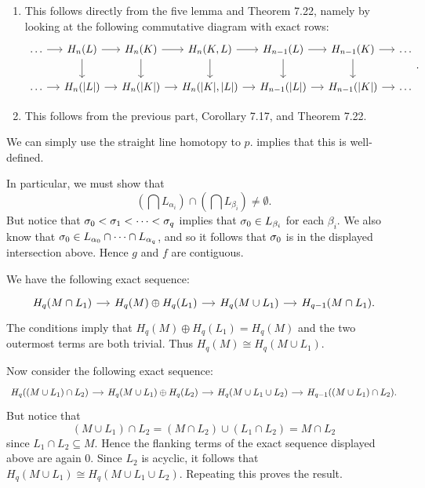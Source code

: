 \documentclass[../../solutions.tex]{subfiles}
\begin{document}
\begin{exercise} \leavevmode
\begin{enumerate}
\item
This follows directly from the five lemma and Theorem 7.22, namely by looking at the following commutative diagram with exact rows:
\[
\begin{tikzcd}[column sep=small]
\dots\ar[r] & H_n(L)\ar[d]\ar[r] & H_n(K)\ar[d]\ar[r] & H_n(K,L)\ar[d]\ar[r] & H_{n-1}(L)\ar[d]\ar[r] & H_{n-1}(K)\ar[d]\ar[r] & \dots\\
\dots\ar[r] & H_n(|L|)\ar[r] & H_n(|K|)\ar[r] & H_n(|K|,|L|)\ar[r] & H_{n-1}(|L|)\ar[r] & H_{n-1}(|K|)\ar[r] & \dots
\end{tikzcd}.
\]

\item
This follows from the previous part, Corollary 7.17, and Theorem 7.22.
\end{enumerate}
\end{exercise}

\begin{exercise} \leavevmode
We can simply use the straight line homotopy to $p$.
 implies that this is well-defined.
\end{exercise}

\begin{exercise} \leavevmode
In particular, we must show that
\[\left(\bigcap L_{\alpha_i}\right)\cap\left(\bigcap L_{\beta_i}\right)\ne\emptyset.\]
But notice that $\sigma_0<\sigma_1<\dots<\sigma_q$ implies that $\sigma_0\in L_{\beta_i}$ for each $\beta_i$.
We also know that $\sigma_0\in L_{\alpha_0}\cap\dots\cap L_{\alpha_q}$, and so it follows that $\sigma_0$ is in the displayed intersection above.
Hence $g$ and $f$ are contiguous.
\end{exercise}

\begin{exercise} \leavevmode
We have the following exact sequence:
\[
\begin{tikzcd}[column sep=small]
H_q(M\cap L_1)\ar[r] & H_q(M)\oplus H_q(L_1)\ar[r] & H_q(M\cup L_1)\ar[r] & H_{q-1}(M\cap L_1).
\end{tikzcd}
\]
The conditions imply that $H_q(M)\oplus H_q(L_1)=H_q(M)$ and the two outermost terms are both trivial.
Thus $H_q(M)\cong H_q(M\cup L_1)$.

Now consider the following exact sequence:
\[
\begin{tikzcd}[column sep=small]
H_q((M\cup L_1)\cap L_2)\ar[r] & H_q(M\cup L_1)\oplus H_q(L_2)\ar[r] & H_q(M\cup L_1\cup L_2)\ar[r] & H_{q-1}((M\cup L_1)\cap L_2).
\end{tikzcd}
\]
But notice that
\[(M\cup L_1)\cap L_2=(M\cap L_2)\cup(L_1\cap L_2)=M\cap L_2\]
since $L_1\cap L_2\subseteq M$.
Hence the flanking terms of the exact sequence displayed above are again 0.
Since $L_2$ is acyclic, it follows that $H_q(M\cup L_1)\cong H_q(M\cup L_1\cup L_2)$.
Repeating this proves the result.
\end{exercise}
\end{document}
